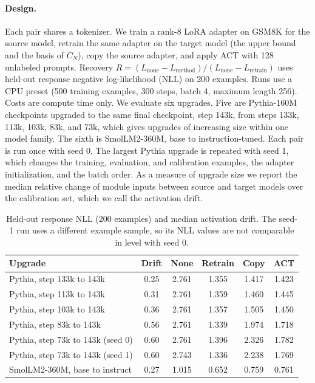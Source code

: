 \documentclass[acmsmall,review]{acmart}
\begin{document}
\paragraph{Design.} Each pair shares a tokenizer. We train a rank-8 LoRA adapter on GSM8K \citep{cobbe2021gsm8k} for the
source model, retrain the same adapter on the target model (the upper bound and the basis of $C_N$), copy the source adapter,
and apply ACT with 128 unlabeled prompts. Recovery $R=(L_{\text{none}}-L_{\text{method}})/(L_{\text{none}}-L_{\text{retrain}})$
uses held-out response negative log-likelihood (NLL) on 200 examples. Runs use a CPU preset (500 training examples, 300 steps,
batch 4, maximum length 256). Costs are compute time only. We evaluate six upgrades. Five are Pythia-160M checkpoints \citep{biderman2023pythia}
upgraded to the same final checkpoint, step 143k, from steps 133k, 113k, 103k, 83k, and 73k, which gives upgrades of increasing size within one model family. The sixth is SmolLM2-360M, base to instruction-tuned.
Each pair is run once with seed 0. The largest Pythia upgrade is repeated with seed 1, which changes the training, evaluation, and calibration examples, the adapter initialization, and the batch order. As a measure of upgrade size we report the median relative change of
module inputs between source and target models over the calibration set, which we call the activation drift.

\begin{table}[t]
\centering
\caption{Held-out response NLL (200 examples) and median activation drift. The seed-1 run uses a different example sample, so its NLL values are not comparable in level with seed 0.}\label{tab:nll}
\begin{tabular}{lccccc}
\toprule
Upgrade & Drift & None & Retrain & Copy & ACT\\
\midrule
Pythia, step 133k to 143k & 0.25 & 2.761 & 1.355 & 1.417 & 1.423\\
Pythia, step 113k to 143k & 0.31 & 2.761 & 1.359 & 1.460 & 1.445\\
Pythia, step 103k to 143k & 0.36 & 2.761 & 1.357 & 1.505 & 1.450\\
Pythia, step 83k to 143k & 0.56 & 2.761 & 1.339 & 1.974 & 1.718\\
Pythia, step 73k to 143k (seed 0) & 0.60 & 2.761 & 1.396 & 2.326 & 1.782\\
Pythia, step 73k to 143k (seed 1) & 0.60 & 2.743 & 1.336 & 2.238 & 1.769\\
SmolLM2-360M, base to instruct & 0.27 & 1.015 & 0.652 & 0.759 & 0.761\\
\bottomrule
\end{tabular}
\end{table}
\end{document}
